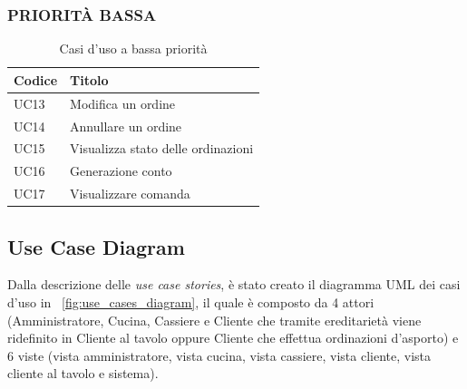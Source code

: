 \subsubsection{PRIORITÀ BASSA}
\begin{table}[htbp]
	\centering
	\begin{tabularx}{\textwidth}{|>{\centering\arraybackslash} m{4em}| >{\raggedright\arraybackslash}X |}
		\hline
		\textbf{Codice} & \textbf{Titolo} \\ [0.5ex]
		\hline\hline
		UC13 & Modifica un ordine  \\
		\hline
		UC14 & Annullare un ordine  \\
		\hline
		UC15 & Visualizza stato delle ordinazioni \\
		\hline
		UC16 & Generazione conto   \\
		\hline
		UC17 & Visualizzare comanda   \\
		\hline
	\end{tabularx}
	\caption{Casi d'uso a bassa priorità}
	\label{tab:use_cases_low_priority}
\end{table}


\subsection{Use Case Diagram}

Dalla descrizione delle \textit{use case stories}, è stato creato il diagramma UML dei casi d'uso in \figurename~\ref{fig:use_cases_diagram}, il quale è composto da 4 attori (Amministratore, Cucina, Cassiere e Cliente che tramite ereditarietà viene ridefinito in Cliente al tavolo oppure Cliente che effettua ordinazioni d’asporto) e 6 viste (vista amministratore, vista cucina, vista cassiere, vista cliente, vista cliente al tavolo e sistema).

